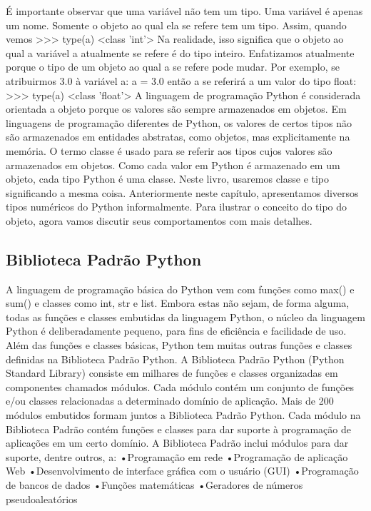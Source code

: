 			É importante observar que uma variável não tem um tipo. Uma variável é apenas
			um nome. Somente o objeto ao qual ela se refere tem um tipo. Assim, quando
			vemos
			>>> type(a)
			<class 'int'>
			Na realidade, isso significa que o objeto ao qual a variável a atualmente se refere
			é do tipo inteiro.
			Enfatizamos atualmente porque o tipo de um objeto ao qual a se refere pode
			mudar. Por exemplo, se atribuirmos 3.0 à variável a:
			a = 3.0
			então a se referirá a um valor do tipo float:
			>>> type(a)
			<class 'float'>
			A linguagem de programação Python é considerada orientada a objeto porque os valores são
			sempre armazenados em objetos. Em linguagens de programação diferentes de Python, os valores
			de certos tipos não são armazenados em entidades abstratas, como objetos, mas explicitamente na
			memória. O termo classe é usado para se referir aos tipos cujos valores são armazenados em
			objetos. Como cada valor em Python é armazenado em um objeto, cada tipo Python é uma classe.
			Neste livro, usaremos classe e tipo significando a mesma coisa.
			Anteriormente neste capítulo, apresentamos diversos tipos numéricos do Python
			informalmente. Para ilustrar o conceito do tipo do objeto, agora vamos discutir seus
			comportamentos com mais detalhes.
			
			\subsection{Biblioteca Padrão Python}
			A linguagem de programação básica do Python vem com funções como max() e sum() e
			classes como int, str e list. Embora estas não sejam, de forma alguma, todas as funções e
			classes embutidas da linguagem Python, o núcleo da linguagem Python é deliberadamente
			pequeno, para fins de eficiência e facilidade de uso. Além das funções e classes básicas, Python
			tem muitas outras funções e classes definidas na Biblioteca Padrão Python. A Biblioteca Padrão
			Python (Python Standard Library) consiste em milhares de funções e classes organizadas em
			componentes chamados módulos.
			Cada módulo contém um conjunto de funções e/ou classes relacionadas a determinado
			domínio de aplicação. Mais de 200 módulos embutidos formam juntos a Biblioteca Padrão Python.
			Cada módulo na Biblioteca Padrão contém funções e classes para dar suporte à programação de
			aplicações em um certo domínio. A Biblioteca Padrão inclui módulos para dar suporte, dentre
			outros, a:
			•Programação em rede
			•Programação de aplicação Web
			•Desenvolvimento de interface gráfica com o usuário (GUI)
			•Programação de bancos de dados
			•Funções matemáticas
			•Geradores de números pseudoaleatórios
			
